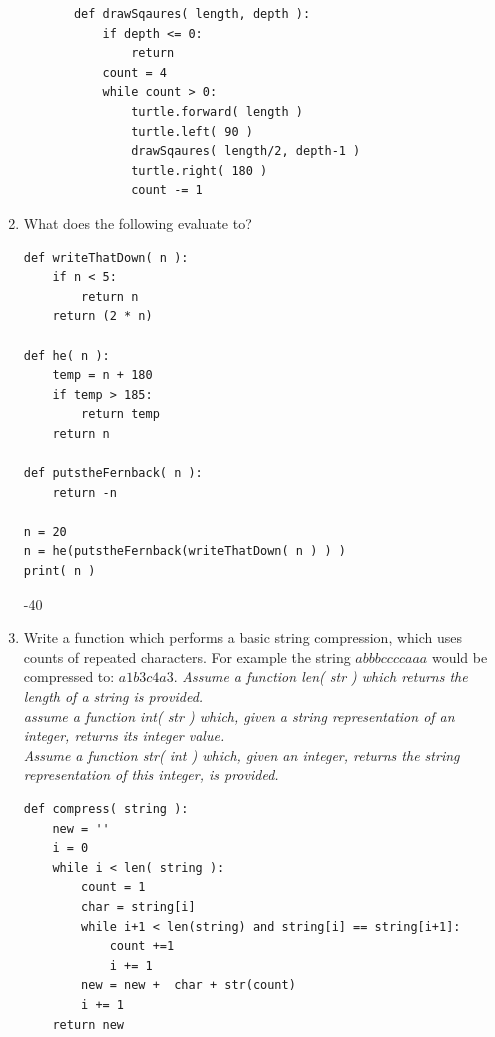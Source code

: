 \documentclass[11pt]{article}
\newenvironment{answer}{\large\lstset{basicstyle=\large}\color{white}}{}
\newenvironment{answer}{\large\lstset{basicstyle=\large}\color{red}}{}
\begin{document}
\begin{enumerate}
\begin{itemize}
        \end{itemize}
    \begin{answer}
    \begin{lstlisting}
       def drawSqaures( length, depth ):
           if depth <= 0:
               return
           count = 4
           while count > 0:
               turtle.forward( length )
               turtle.left( 90 )
               drawSqaures( length/2, depth-1 )
               turtle.right( 180 )
               count -= 1
      \end{lstlisting}
     \end{answer}

    \item What does the following evaluate to?
    \begin{lstlisting}
def writeThatDown( n ):
    if n < 5:
        return n
    return (2 * n)

def he( n ):
    temp = n + 180
    if temp > 185:
        return temp
    return n

def putstheFernback( n ):
    return -n

n = 20
n = he(putstheFernback(writeThatDown( n ) ) )
print( n )
    \end{lstlisting}
    \begin{answer}
        -40
    \end{answer}

\item Write a function which performs a basic string compression, which uses counts of repeated characters. For example 
the string $abbbccccaaa$ would be compressed to: $a1b3c4a3$. 
 \emph{Assume a function len( str ) which returns the length of a string is provided. \\
      assume a function int( str ) which, given a string representation of an integer, returns its integer value. \\
      Assume a function str( int ) which, given an integer, returns the string representation of this integer, is provided. }

\begin{answer}
\begin{lstlisting}
def compress( string ):
    new = ''
    i = 0
    while i < len( string ):
        count = 1
        char = string[i]
        while i+1 < len(string) and string[i] == string[i+1]:
            count +=1
            i += 1
        new = new +  char + str(count)
        i += 1
    return new
\end{lstlisting}
\end{answer}
 \end{enumerate}
\end{document}
